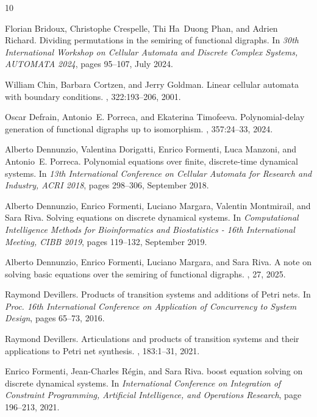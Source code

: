 \documentclass[a4paper, 11pt]{article}
\theoremstyle{plain}
\theoremstyle{definition}
\begin{document}
\begin{thebibliography}{10}

Florian Bridoux, Christophe Crespelle, Thi Ha~Duong Phan, and Adrien Richard.
\newblock Dividing permutations in the semiring of functional digraphs.
\newblock In {\em 30th International Workshop on Cellular Automata and Discrete Complex Systems, AUTOMATA 2024}, pages 95--107, July 2024.

William Chin, Barbara Cortzen, and Jerry Goldman.
\newblock Linear cellular automata with boundary conditions.
, 322:193--206, 2001.

Oscar Defrain, Antonio~E. Porreca, and Ekaterina Timofeeva.
\newblock Polynomial-delay generation of functional digraphs up to isomorphism.
, 357:24--33, 2024.

Alberto Dennunzio, Valentina Dorigatti, Enrico Formenti, Luca Manzoni, and Antonio~E. Porreca.
\newblock Polynomial equations over finite, discrete-time dynamical systems.
\newblock In {\em 13th International Conference on Cellular Automata for Research and Industry, ACRI 2018}, pages 298--306, September 2018.

Alberto Dennunzio, Enrico Formenti, Luciano Margara, Valentin Montmirail, and Sara Riva.
\newblock Solving equations on discrete dynamical systems.
\newblock In {\em Computational Intelligence Methods for Bioinformatics and Biostatistics - 16th International Meeting, CIBB 2019}, pages 119--132, September 2019.

Alberto Dennunzio, Enrico Formenti, Luciano Margara, and Sara Riva.
\newblock A note on solving basic equations over the semiring of functional digraphs.
, 27, 2025.

Raymond Devillers.
\newblock Products of transition systems and additions of {P}etri nets.
\newblock In {\em Proc. 16th International Conference on Application of Concurrency to System Design}, pages 65--73, 2016.

Raymond Devillers.
\newblock Articulations and products of transition systems and their applications to {P}etri net synthesis.
, 183:1--31, 2021.

Enrico Formenti, Jean-Charles R\'egin, and Sara Riva.
 boost equation solving on discrete dynamical systems.
\newblock In {\em International Conference on Integration of Constraint Programming, Artificial Intelligence, and Operations Research}, page 196–213, 2021.


\end{thebibliography}
\end{document}
